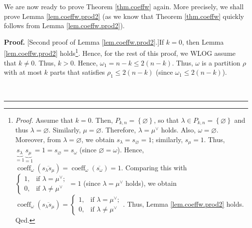 \documentclass[numbers=enddot,12pt,final,onecolumn,notitlepage]{scrartcl}%
\theoremstyle{definition}
\newenvironment{proof}[1][Proof]{\noindent\textbf{#1.} }{\ \rule{0.5em}{0.5em}}
\begin{document}
We are now ready to prove Theorem \ref{thm.coeffw} again. More precisely, we
shall prove Lemma \ref{lem.coeffw.prod2} (as we know that Theorem
\ref{thm.coeffw} quickly follows from Lemma \ref{lem.coeffw.prod2}).

\begin{proof}
[Second proof of Lemma \ref{lem.coeffw.prod2}.]If $k=0$, then Lemma
\ref{lem.coeffw.prod2} holds\footnote{\textit{Proof.} Assume that $k=0$. Then,
$P_{k,n}=\left\{  \varnothing\right\}  $, so that $\lambda\in P_{k,n}=\left\{
\varnothing\right\}  $ and thus $\lambda=\varnothing$. Similarly,
$\mu=\varnothing$. Therefore, $\lambda=\mu^{\vee}$ holds. Also, $\omega
=\varnothing$. Moreover, from $\lambda=\varnothing$, we obtain $s_{\lambda
}=s_{\varnothing}=1$; similarly, $s_{\mu}=1$. Thus, $\underbrace{s_{\lambda}%
}_{=1}\underbrace{s_{\mu}}_{=1}=1=s_{\varnothing}=s_{\omega}$ (since
$\varnothing=\omega$). Hence, $\operatorname*{coeff}\nolimits_{\omega}\left(
\overline{s_{\lambda}s_{\mu}}\right)  =\operatorname*{coeff}\nolimits_{\omega
}\left(  \overline{s_{\omega}}\right)  =1$. Comparing this with $%
\begin{cases}
1, & \text{if }\lambda=\mu^{\vee};\\
0, & \text{if }\lambda\neq\mu^{\vee}%
\end{cases}
=1$ (since $\lambda=\mu^{\vee}$ holds), we obtain $\operatorname*{coeff}%
\nolimits_{\omega}\left(  \overline{s_{\lambda}s_{\mu}}\right)  =%
\begin{cases}
1, & \text{if }\lambda=\mu^{\vee};\\
0, & \text{if }\lambda\neq\mu^{\vee}%
\end{cases}
$. Thus, Lemma \ref{lem.coeffw.prod2} holds. Qed.}. Hence, for the rest of
this proof, we WLOG assume that $k\neq0$. Thus, $k>0$. Hence, $\omega
_{1}=n-k\leq2\left(  n-k\right)  $. Thus, $\omega$ is a partition $\rho$ with
at most $k$ parts that satisfies $\rho_{1}\leq2\left(  n-k\right)  $ (since
$\omega_{1}\leq2\left(  n-k\right)  $).


\end{proof}
\end{document}
